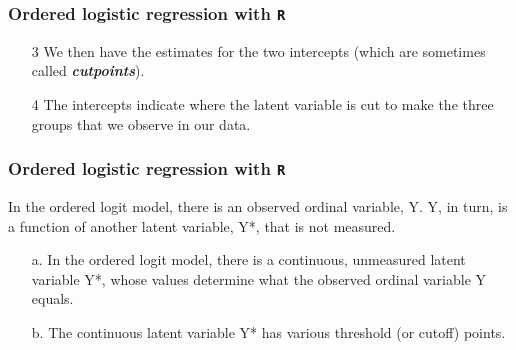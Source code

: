 \documentclass[00-GLMregslides.tex]{subfiles}
\begin{document}
\begin{frame}
\frametitle{Ordered logistic regression with \texttt{R} }
	\Large
\begin{itemize}
\item[3]	
We then have the estimates for the two intercepts (which are sometimes called \textbf{\textit{cutpoints}}). 
\item[4] The intercepts indicate where the latent variable is cut to make the three groups that we observe in our data. 
\end{itemize}
\end{frame}


\begin{frame}
\frametitle{Ordered logistic regression with \texttt{R} }
In the ordered logit model, there is an observed ordinal variable, Y.
Y, in turn, is a function of another latent variable, Y*, that is not measured.

\begin{itemize}
\item[a.] In the ordered logit model, there is a continuous, unmeasured latent variable Y*,
whose values determine what the observed ordinal variable Y equals.
\item[b.] The continuous latent variable Y* has various threshold (or cutoff) points. 
\end{itemize}
\end{frame}
\end{document}
